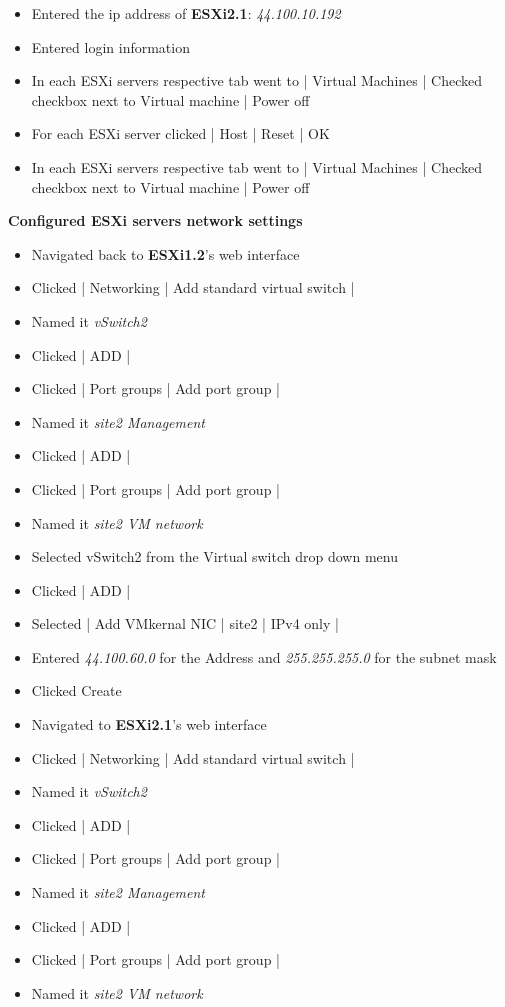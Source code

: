 \documentclass[letterpaper]{article}
\begin{document}
\begin{enumerate}
\begin{itemize}
\begin{itemize}
\item Entered the ip address of \textbf{ESXi2.1}: \emph{44.100.10.192}
\item Entered login information
\item In each ESXi servers respective tab went to | Virtual Machines | Checked checkbox next to Virtual machine | Power off
\item For each ESXi server clicked | Host | Reset | OK
\item In each ESXi servers respective tab went to | Virtual Machines | Checked checkbox next to Virtual machine | Power off
\end{itemize}
\textbf{Configured ESXi servers network settings}
\begin{itemize}
\item Navigated back to \textbf{ESXi1.2}'s web interface
\item Clicked | Networking | Add standard virtual switch |
\item Named it \emph{vSwitch2}
\item Clicked | ADD |
\item Clicked | Port groups | Add port group |
\item Named it \emph{site2 Management}
\item Clicked | ADD |
\item Clicked | Port groups | Add port group |
\item Named it \emph{site2 VM network}
\item Selected vSwitch2 from the Virtual switch drop down menu
\item Clicked | ADD |
\item Selected | Add VMkernal NIC | site2 | IPv4 only |
\item Entered \emph{44.100.60.0} for the Address and \emph{255.255.255.0} for the subnet mask
\item Clicked Create
\item Navigated to \textbf{ESXi2.1}'s web interface
\item Clicked | Networking | Add standard virtual switch |
\item Named it \emph{vSwitch2}
\item Clicked | ADD |
\item Clicked | Port groups | Add port group |
\item Named it \emph{site2 Management}
\item Clicked | ADD |
\item Clicked | Port groups | Add port group |
\item Named it \emph{site2 VM network}

\end{itemize}
\end{itemize}
\end{enumerate}
\end{document}
